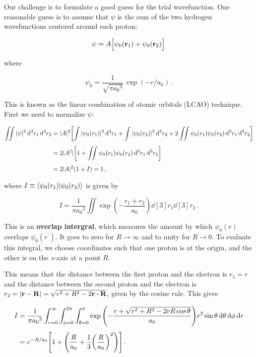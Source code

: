\documentclass[12pt, titlepage]{article}
\begin{document}

Our challenge is to formulate a good guess for the trial wavefunction. One reasonable guess is to assume that $\psi$ is the sum of the two hydrogen wavefunctions centered around each proton:

\begin{equation}
	\psi = A\Bigl[\psi_0(\vb{r}_1) + \psi_0(\vb{r}_2)\Bigr] \,
\end{equation}

where 

\begin{equation}
	\psi_0 = \frac{1}{\sqrt{\pi {a_0}^3}}\,\exp(-r/a_0) \,.
\end{equation}

This is known as the linear combination of atomic orbitals (LCAO) technique. First we need to normalize $\psi$:

\begin{align*}
	\iint|\psi|^2\dd[3]{r_1}\dd[3]{r_2} &= |A|^2\qty[\int|\psi_0(r_1)|^2\dd[3]{r_1} + \int|\psi_0(r_2)|^2\dd[3]{r_2} + 2\iint\psi_0(r_1)\psi_0(r_2)\dd[3]{r_1}\dd[3]{r_2}] \\[4pt]
	&= 2|A^2|\qty[1 + \iint\psi_0(r_1)\psi_0(r_2)\dd[3]{r_1}\dd[3]{r_2}] \\[4pt]
	&= 2|A|^2(1+I) = 1\,,
\end{align*}

where $I\equiv\bra{\psi_0(r_1)}\ket{\psi_0(r_2)}$ is given by 

\begin{equation*}
	I = \frac{1}{\pi{a_0}^3}\iint\exp(-\frac{r_1 + r_2}{a_0})\dd[3]{r_1}\dd[3]{r_2} \,.
\end{equation*}

This is an \textbf{overlap intergral}, which measures the amount by which $\psi_0(r)$ overlaps $\psi_0(r^\prime)$. It goes to zero for $R\rightarrow\infty$ and to unity for $R\rightarrow 0$. To evaluate this integral, we choose coordinates such that one proton is at the origin, and the other is on the $z$-axis at a point $R$.


This means that the distance between the first proton and the electron is $r_1 = r$ and the distance between the second proton and the electron is $r_2 = |\vb{r} - \vb{R}| = \sqrt{r^2 + R^2 - 2\vb{r}\vdot\vb{R}}$, given by the cosine rule. This gives

\begin{align*}
I &= \frac{1}{\pi{a_0}^3}\int_{r=0}^{\infty}\int_{\phi=0}^{2\pi}\int_{\theta=0}^{\pi}\exp\qty(-\frac{r + \sqrt{r^2 + R^2 - 2rR\cos\theta}}{a_0})r^2\sin\theta\dd{\theta}\dd{\phi}\dd{r} \\[4pt]
&= e^{-R/a_0}\qty[1 + \qty(\frac{R}{a_0} + \frac{1}{3}\qty(\frac{R}{a_0})^2)]\,.
\end{align*}
\end{document}
